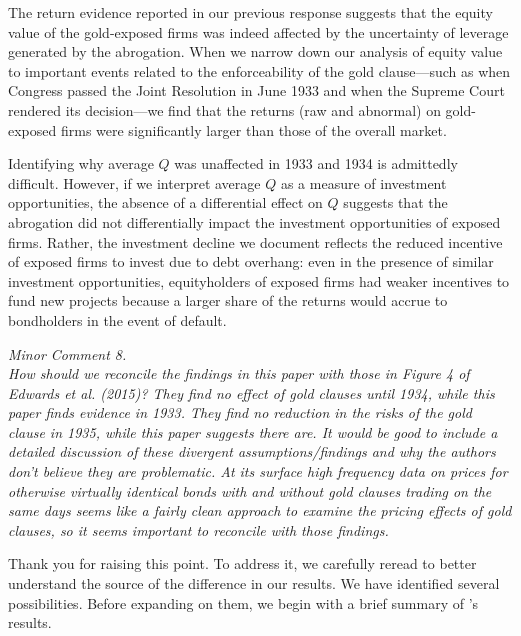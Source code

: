 \noindent 

The return evidence reported in our previous response suggests that the equity value of the gold-exposed firms was indeed affected by the uncertainty of leverage generated by the abrogation. When we narrow down our analysis of equity value to important events related to the enforceability of the gold clause---such as when Congress passed the Joint Resolution in June 1933 and when the Supreme Court rendered its decision---we find that the returns (raw and abnormal) on gold-exposed firms were significantly larger than those of the overall market.

Identifying why average $Q$ was unaffected in 1933 and 1934 is admittedly difficult. However, if we interpret average $Q$ as a measure of investment opportunities, the absence of a differential effect on $Q$ suggests that the abrogation did not differentially impact the investment opportunities of exposed firms. Rather, the investment decline we document reflects the reduced incentive of exposed firms to invest due to debt overhang: even in the presence of similar investment opportunities, equityholders of exposed firms had weaker incentives to fund new projects because a larger share of the returns would accrue to bondholders in the event of default.

\bigskip

\noindent \textit{\textcolor{red!60!black}{
Minor Comment 8.\\
How should we reconcile the findings in this paper with those in Figure 4 of Edwards et al. (2015)? They find no effect of gold clauses until 1934, while this paper finds evidence in 1933. They find no reduction in the risks of the gold clause in 1935, while this paper suggests there are. It would be good to include a detailed discussion of these divergent assumptions/findings and why the authors don't believe they are problematic. At its surface high frequency data on prices for otherwise virtually identical bonds with and without gold clauses trading on the same days seems like a fairly clean approach to examine the pricing effects of gold clauses, so it seems important to reconcile with those findings.
}}

\bigskip

\noindent Thank you for raising this point. To address it, we carefully reread \cite{Edwards2015} to better understand the source of the difference in our results. We have identified several possibilities. Before expanding on them, we begin with a brief summary of \cite{Edwards2015}'s results.

